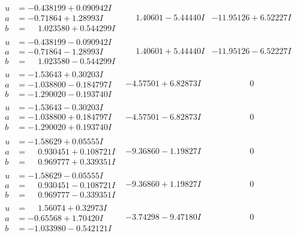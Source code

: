 \documentclass[1p]{elsarticle_modified}
\theoremstyle{definition}
\begin{document}
$$\begin{array}{c|c|c}
\begin{aligned}
u &= -0.438199 + 0.090942 I \\
a &= -0.71864 + 1.28993 I \\
b &= \phantom{-}1.023580 + 0.544299 I\end{aligned}
 & \phantom{-}1.40601 - 5.44440 I & -11.95126 + 6.52227 I \\ \hline\begin{aligned}
u &= -0.438199 - 0.090942 I \\
a &= -0.71864 - 1.28993 I \\
b &= \phantom{-}1.023580 - 0.544299 I\end{aligned}
 & \phantom{-}1.40601 + 5.44440 I & -11.95126 - 6.52227 I \\ \hline\begin{aligned}
u &= -1.53643 + 0.30203 I \\
a &= -1.038800 - 0.184797 I \\
b &= -1.290020 - 0.193740 I\end{aligned}
 & -4.57501 + 6.82873 I & \phantom{-0.000000 } 0 \\ \hline\begin{aligned}
u &= -1.53643 - 0.30203 I \\
a &= -1.038800 + 0.184797 I \\
b &= -1.290020 + 0.193740 I\end{aligned}
 & -4.57501 - 6.82873 I & \phantom{-0.000000 } 0 \\ \hline\begin{aligned}
u &= -1.58629 + 0.05555 I \\
a &= \phantom{-}0.930451 + 0.108721 I \\
b &= \phantom{-}0.969777 + 0.339351 I\end{aligned}
 & -9.36860 - 1.19827 I & \phantom{-0.000000 } 0 \\ \hline\begin{aligned}
u &= -1.58629 - 0.05555 I \\
a &= \phantom{-}0.930451 - 0.108721 I \\
b &= \phantom{-}0.969777 - 0.339351 I\end{aligned}
 & -9.36860 + 1.19827 I & \phantom{-0.000000 } 0 \\ \hline\begin{aligned}
u &= \phantom{-}1.56074 + 0.32973 I \\
a &= -0.65568 + 1.70420 I \\
b &= -1.033980 - 0.542121 I\end{aligned}
 & -3.74298 - 9.47180 I & \phantom{-0.000000 } 0 \\ \hline\begin{aligned}

\end{aligned}
\end{array}$$
\end{document}
